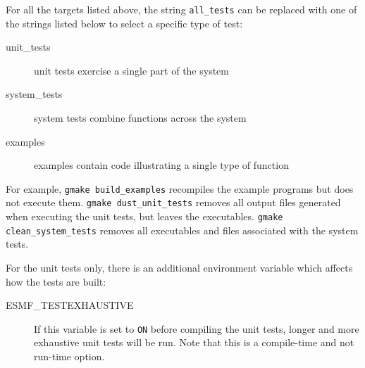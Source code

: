 For all the targets listed above, the string {\tt all\_tests} can be
replaced with one of the strings listed below to select a
specific type of test:
\begin{description}
\item[unit\_tests] unit tests exercise a single part of the system
\item[system\_tests] system tests combine functions across the system
\item[examples] examples contain code illustrating a single type of function
\end{description}
For example, {\tt gmake build\_examples} recompiles the example programs but 
does not execute them. {\tt gmake dust\_unit\_tests} removes all
output files generated when executing the unit tests, but leaves the
executables. {\tt gmake clean\_system\_tests} removes all executables and files
associated with the system tests.

For the unit tests only, there is an additional environment variable
which affects how the tests are built:
\begin{description}
\item[ESMF\_TESTEXHAUSTIVE]
If this variable is set to {\tt ON} before compiling the unit tests,
longer and more exhaustive unit tests will be run.  Note that this is a
compile-time and not run-time option.
\end{description}


